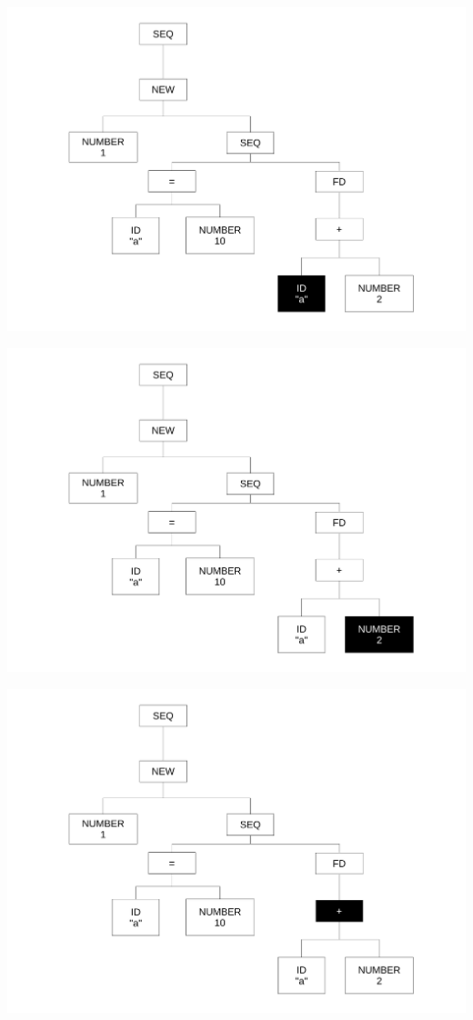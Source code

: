 \begin{frame}
\includegraphics[scale=0.3]{doc/Presentation/img/arbre10.pdf}
\end{frame}

\begin{frame}
\includegraphics[scale=0.3]{doc/Presentation/img/arbre11.pdf}
\end{frame}

\begin{frame}
\includegraphics[scale=0.3]{doc/Presentation/img/arbre9.pdf}
\end{frame}

